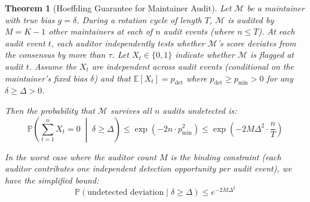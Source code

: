\documentclass[12pt,a4paper]{article}
\newtheorem{theorem}{Theorem}[section]
\theoremstyle{remark}
\newcommand{\E}{\mathbb{E}}
\newcommand{\Pbb}{\mathbb{P}}
\begin{document}
\begin{theorem}[Hoeffding Guarantee for Maintainer Audit]\label{thm:hoeffding}
Let $\mathcal{M}$ be a maintainer with true bias $g = \delta$. During a rotation
cycle of length $T$, $\mathcal{M}$ is audited by $M = K-1$ other maintainers
at each of $n$ audit events (where $n \leq T$). At each audit event $t$, each
auditor independently tests whether $\mathcal{M}$'s score deviates from the
consensus by more than $\tau$. Let $X_t \in \{0, 1\}$ indicate whether
$\mathcal{M}$ is flagged at audit $t$. Assume the $X_t$ are independent across
audit events (conditional on the maintainer's fixed bias $\delta$) and that
$\E[X_t] = p_{\text{det}}$ where $p_{\text{det}} \geq p_{\text{min}} > 0$ for
any $\delta \geq \Delta > 0$.

Then the probability that $\mathcal{M}$ survives all $n$ audits undetected is:
\begin{equation}\label{eq:hoeffding_main}
    \Pbb\left(\sum_{t=1}^{n} X_t = 0 \;\middle|\; \delta \geq \Delta\right)
    \leq \exp\left(-2 n \cdot p_{\text{min}}^2\right)
    \leq \exp\left(-2 M \Delta^2 \cdot \frac{n}{T}\right)
\end{equation}

In the worst case where the auditor count $M$ is the binding constraint (each
auditor contributes one independent detection opportunity per audit event), we
have the simplified bound:
\begin{equation}\label{eq:hoeffding_simple}
    \boxed{\Pbb(\text{undetected deviation} \mid \delta \geq \Delta) \leq e^{-2M\Delta^2}}
\end{equation}
\end{theorem}
\end{document}

